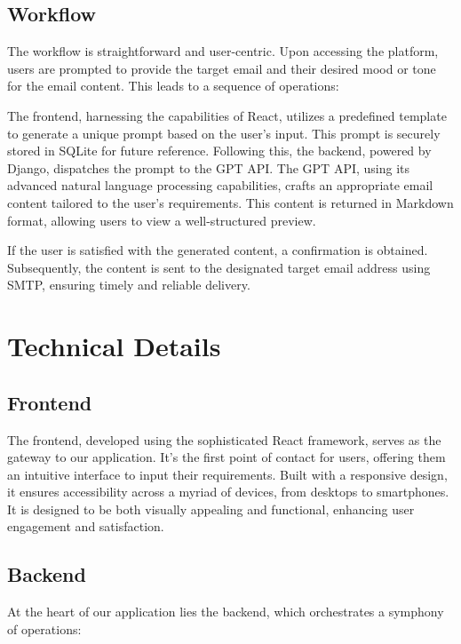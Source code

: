 \documentclass[12pt]{article}
\begin{document}
\subsection{Workflow}
The workflow is straightforward and user-centric. Upon accessing the platform, users are prompted to provide the target email and their desired mood or tone for the email content. This leads to a sequence of operations:

The frontend, harnessing the capabilities of React, utilizes a predefined template to generate a unique prompt based on the user's input. This prompt is securely stored in SQLite for future reference. Following this, the backend, powered by Django, dispatches the prompt to the GPT API. The GPT API, using its advanced natural language processing capabilities, crafts an appropriate email content tailored to the user's requirements. This content is returned in Markdown format, allowing users to view a well-structured preview.

If the user is satisfied with the generated content, a confirmation is obtained. Subsequently, the content is sent to the designated target email address using SMTP, ensuring timely and reliable delivery.

\section{Technical Details}

\subsection{Frontend}
The frontend, developed using the sophisticated React framework, serves as the gateway to our application. It's the first point of contact for users, offering them an intuitive interface to input their requirements. Built with a responsive design, it ensures accessibility across a myriad of devices, from desktops to smartphones. It is designed to be both visually appealing and functional, enhancing user engagement and satisfaction.

\subsection{Backend}
At the heart of our application lies the backend, which orchestrates a symphony of operations:
\end{document}
